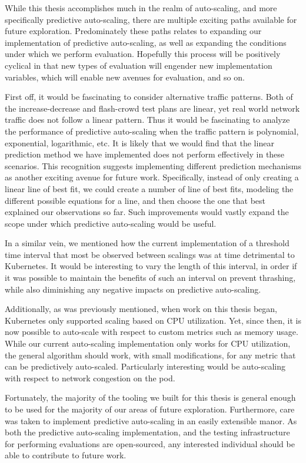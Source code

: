 While this thesis accomplishes much in the realm of auto-scaling, and more
specifically predictive auto-scaling, there are multiple exciting paths
available for future exploration. Predominately these paths relates to expanding
our implementation of predictive auto-scaling, as well as expanding the
conditions under which we perform evaluation. Hopefully this process will be
positively cyclical in that new types of evaluation will engender new
implementation variables, which will enable new avenues for evaluation, and so
on.

First off, it would be fascinating to consider alternative traffic patterns.
Both of the increase-decrease and flash-crowd test plans are linear, yet real
world network traffic does not follow a linear pattern. Thus it would be
fascinating to analyze the performance of predictive auto-scaling when the
traffic pattern is polynomial, exponential, logarithmic, etc. It is likely that
we would find that the linear prediction method we have implemented does not
perform effectively in these scenarios. This recognition suggests implementing
different prediction mechanisms as another exciting avenue for future work.
Specifically, instead of only creating a linear line of best fit, we could
create a number of line of best fits, modeling the different possible equations
for a line, and then choose the one that best explained our observations so far.
Such improvements would vastly expand the scope under which predictive
auto-scaling would be useful.

In a similar vein, we mentioned how the current implementation of a threshold time
interval that most be observed between scalings was at time detrimental to
Kubernetes. It would be interesting to vary the length of this interval, in
order if it was possible to maintain the benefits of such an interval on prevent
thrashing, while also diminishing any negative impacts on predictive
auto-scaling.

Additionally, as was previously mentioned, when work on this thesis began,
Kubernetes only supported scaling based on CPU utilization. Yet, since then, it
is now possible to auto-scale with respect to custom metrics such as memory
usage. While our current auto-scaling implementation only works for CPU
utilization, the general algorithm should work, with small modifications, for
any metric that can be predictively auto-scaled. Particularly interesting would
be auto-scaling with respect to network congestion on the pod.

Fortunately, the majority of the tooling we built for this thesis is general
enough to be used for the majority of our areas of future exploration.
Furthermore, care was taken to implement predictive auto-scaling in an easily
extensible manor. As both the predictive auto-scaling implementation, and the
testing infrastructure for performing evaluations are open-sourced, any
interested individual should be able to contribute to future work.

